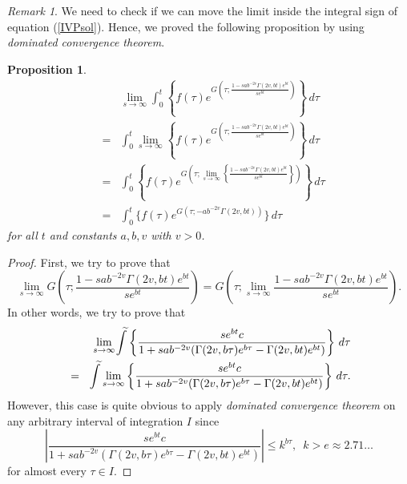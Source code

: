 \documentclass[preprint, 12pt]{elsarticle}
\numberwithin{equation}{section}
\theoremstyle{plain}
\newtheorem{proposition}{Proposition}[section]
\theoremstyle{remark}
\newtheorem{remark}{Remark}[section]
\newcommand{\nocomma}{}
\begin{document}
\begin{remark}\label{propremark}
We need to check if we can move the limit inside the integral sign of equation (\ref{IVPsol}). Hence, we proved the following proposition by using \textit{dominated convergence theorem}.

\begin{proposition} \label{prop1}
\begin{eqnarray*}
& & \lim_{s \rightarrow \infty} \int_0^t \left\{ f (\tau) e^{G \left( \tau ; \frac{1 - s a b^{- 2 v} \Gamma (2 v \nocomma, b t) e^{b t}}{s e^{bt}} \right)} \right\}\, d \tau\\ 
& = & \int_0^t \lim_{s \rightarrow \infty} \left\{ f (\tau) e^{G \left( \tau ; \frac{1 - s a b^{- 2 v} \Gamma (2 v \nocomma, b t) e^{b t}}{s e^{bt}} \right)} \right\}\, d \tau\\
& = & \int_0^t \left\{ f (\tau) e^{G \left( \tau ; \lim_{s \rightarrow \infty} \left\{ \frac{1 - s a b^{- 2 v} \Gamma (2 v \nocomma, b t) e^{b t}}{s e^{bt}} \right\} \right)} \right\}\, d \tau\\
& = & \int_0^t \{ f (\tau) e^{G (\tau ; - a b^{- 2 v} \Gamma (2 v \nocomma, b t))} \}\, d \tau
\end{eqnarray*}
for all $t$ and constants $a, b, v$ with $v > 0$.
\end{proposition}

\begin{proof}
First, we try to prove that
\[ \lim_{s \rightarrow \infty} G \left( \tau ; \frac{1 - s a b^{- 2 v} \Gamma (2 v \nocomma, b t) e^{b t}}{s e^{bt}} \right) = G \left( \tau ; \lim_{s \rightarrow \infty}  \frac{1 - s a b^{- 2 v} \Gamma (2 v \nocomma, b t) e^{b t}}{s e^{bt}} \right) . \]
In other words, we try to prove that
\begin{eqnarray*}
& & \lim_{s \rightarrow \infty} \kern6pt\widetilde{\kern-7pt\int} \left\{ \frac{s e^{bt} c}{1 + s a b^{- 2 v}  (\Gamma (2 v, b \tau) e^{b \tau} - \Gamma (2 v \nocomma, b t) e^{b t})} \right\}\, d \tau\\
&=& \kern6pt\widetilde{\kern-7pt\int} \lim_{s \rightarrow \infty} \left\{ \frac{s e^{bt} c}{1 + s a b^{- 2 v}  (\Gamma (2 v, b \tau) e^{b \tau} - \Gamma (2 v \nocomma, b t) e^{b t})} \right\}\, d \tau .
\end{eqnarray*}
However, this case is quite obvious to apply \textit{dominated convergence theorem} on any arbitrary interval of integration $I$ since 
\[\displaystyle{\left| \frac{s e^{bt} c}{1 + s a b^{- 2 v}  (\Gamma (2 v, b \tau) e^{b \tau} - \Gamma (2 v \nocomma, b t) e^{b t})} \right| \leqslant k^{b \tau},\,\,\, k>e\approx2.71\ldots}\]
for almost every $\tau \in I$.
  

\end{proof}
\end{remark}
\end{document}
